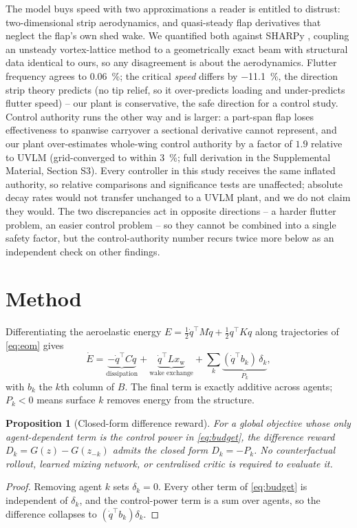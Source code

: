 \documentclass[journal]{new-aiaa}
\newtheorem{proposition}{Proposition}
\begin{document}
The model buys speed with two approximations a reader is entitled to
distrust: two-dimensional strip aerodynamics, and quasi-steady flap
derivatives that neglect the flap's own shed wake. We quantified both
against SHARPy \cite{delcarre2019sharpy}, coupling an unsteady
vortex-lattice method \cite{murua2012uvlm} to a geometrically exact beam
with structural data identical to ours, so any disagreement is about the
aerodynamics. Flutter frequency agrees to \SI{0.06}{\percent}; the critical
\emph{speed} differs by \SI{-11.1}{\percent}, the direction strip theory
predicts (no tip relief, so it over-predicts loading and under-predicts
flutter speed) -- our plant is conservative, the safe direction for a
control study. Control authority runs the other way and is larger: a
part-span flap loses effectiveness to spanwise carryover a sectional
derivative cannot represent, and our plant over-estimates whole-wing
control authority by a factor of $1.9$ relative to UVLM (grid-converged to
within \SI{3}{\percent}; full derivation in the Supplemental Material,
Section S3). Every controller in this study receives the same inflated
authority, so relative comparisons and significance tests are unaffected;
absolute decay rates would not transfer unchanged to a UVLM plant, and we
do not claim they would. The two discrepancies act in opposite directions
-- a harder flutter problem, an easier control problem -- so they cannot be
combined into a single safety factor, but the control-authority number
recurs twice more below as an independent check on other findings.

\section{Method}
\label{sec:method}

Differentiating the aeroelastic energy
$E=\tfrac12 \dot q^{\top} M \dot q + \tfrac12 q^{\top} K q$ along
trajectories of \eqref{eq:eom} gives
\begin{equation}
\dot E
= \underbrace{-\dot q^{\top} C \dot q}_{\text{dissipation}}
+ \underbrace{\dot q^{\top} L x_{\mathrm{w}}}_{\text{wake exchange}}
+ \sum_{k} \underbrace{(\dot q^{\top} b_k)\, \delta_k}_{P_k} ,
\label{eq:budget}
\end{equation}
with $b_k$ the $k$th column of $B$. The final term is exactly additive
across agents; $P_k<0$ means surface $k$ removes energy from the structure.

\begin{proposition}[Closed-form difference reward]
\label{prop:diff}
For a global objective whose only agent-dependent term is the control power
in \eqref{eq:budget}, the difference reward $D_k = G(z) - G(z_{-k})$ admits
the closed form $D_k = -P_k$. No counterfactual rollout, learned mixing
network, or centralised critic is required to evaluate it.
\end{proposition}
\begin{proof}
Removing agent $k$ sets $\delta_k=0$. Every other term of \eqref{eq:budget}
is independent of $\delta_k$, and the control-power term is a sum over
agents, so the difference collapses to $(\dot q^{\top} b_k)\delta_k$.
\end{proof}
\end{document}

